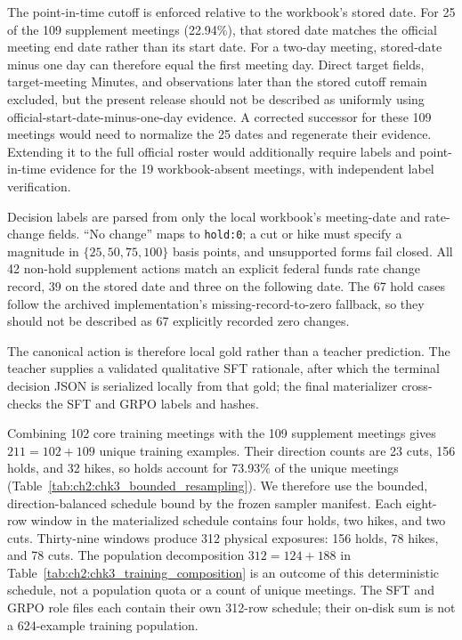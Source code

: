 The point-in-time cutoff is enforced relative to the workbook's stored date.
For 25 of the 109 supplement meetings (22.94\%), that stored date matches the
official meeting end date rather than its start date. For a two-day meeting,
stored-date minus one day can therefore equal the first meeting day. Direct
target fields, target-meeting Minutes, and observations later than the stored
cutoff remain excluded,
but the present release should not be described as uniformly using
official-start-date-minus-one-day evidence. A corrected successor for these 109
meetings would need to normalize the 25 dates and regenerate their evidence.
Extending it to the full official roster would additionally require labels and
point-in-time evidence for the 19 workbook-absent meetings, with independent
label verification.

Decision labels are parsed from only the local workbook's meeting-date and
rate-change fields. ``No change'' maps to \texttt{hold:0}; a cut or hike must
specify a magnitude in $\{25,50,75,100\}$ basis points, and unsupported forms
fail closed. All 42 non-hold supplement actions match an
explicit federal funds rate change record, 39 on the stored date and three on
the following date. The 67 hold cases follow the archived implementation's
missing-record-to-zero fallback, so they should not be described as 67
explicitly recorded zero changes.

The canonical action is therefore local gold rather than a teacher prediction.
The teacher supplies a validated qualitative SFT rationale, after which the
terminal decision JSON is serialized locally from that gold; the final
materializer cross-checks the SFT and GRPO labels and hashes.

Combining 102 core training meetings with the 109 supplement meetings gives
$211=102+109$ unique training examples. Their direction counts are 23 cuts,
156 holds, and 32 hikes, so holds account for 73.93\% of the unique meetings
(Table~\ref{tab:ch2:chk3_bounded_resampling}).
We therefore use the bounded, direction-balanced schedule bound by the frozen
sampler manifest. Each eight-row window in the materialized schedule
contains four holds, two hikes, and two cuts. Thirty-nine windows produce 312
physical exposures: 156 holds, 78 hikes, and 78 cuts. The population decomposition
$312=124+188$ in Table~\ref{tab:ch2:chk3_training_composition} is an outcome of
this deterministic schedule, not a population quota or a count of unique
meetings. The SFT and GRPO role files each contain their own 312-row schedule;
their on-disk sum is not a 624-example training population.


